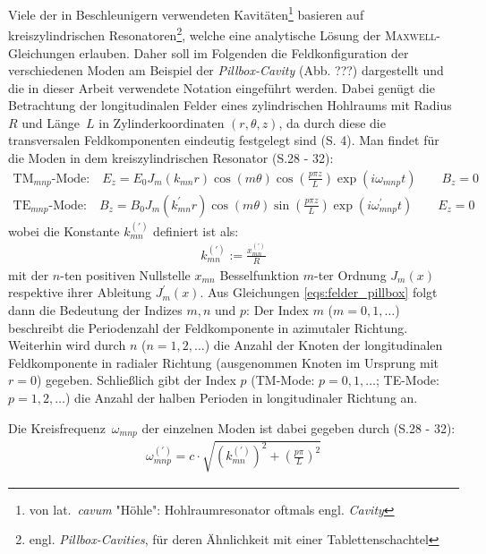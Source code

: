 Viele der in Beschleunigern verwendeten Kavitäten\footnote{von lat.\ \emph{cavum} "Höhle": Hohlraumresonator oftmals engl. \emph{Cavity}} basieren auf kreiszylindrischen Resonatoren\footnote{engl. \emph{Pillbox-Cavities}, für deren Ähnlichkeit mit einer Tablettenschachtel}, welche eine analytische Lösung der \textsc{Maxwell}-Gleichungen erlauben.
Daher soll im Folgenden die Feldkonfiguration der verschiedenen Moden am Beispiel der \emph{Pillbox-Cavity} (Abb. ???) dargestellt und die in dieser Arbeit verwendete Notation eingeführt werden.
Dabei genügt die Betrachtung der longitudinalen Felder eines zylindrischen Hohlraums mit Radius~$R$ und Länge~$L$ in Zylinderkoordinaten $(r, \theta, z)$, da durch diese die transversalen Feldkomponenten eindeutig festgelegt sind \cite{hillert} (S. 4).
Man findet für die Moden in dem kreiszylindrischen Resonator \cite{wangler} (S.28 - 32):
\begin{subequations}
  \begin{align}
  \mathrm{TM}_{mnp}\text{-Mode:} \quad E_z = E_0 J_m(k_{mn} r) \cos(m \theta) \cos\left(\frac{p \pi z}{L}\right) \exp(i \omega_{mnp} t) \qquad B_z = 0\\
  \mathrm{TE}_{mnp}\text{-Mode:} \quad B_z = B_0 J_m(k_{mn}^\prime r) \cos(m \theta) \sin\left(\frac{p \pi z}{L}\right) \exp(i \omega_{mnp}^\prime t) \qquad  E_z = 0
  \end{align}
  \label{eqs:felder_pillbox}
\end{subequations}
wobei die Konstante $k_{mn}^{(\prime)}$ definiert ist als:
\begin{align}
k_{mn}^{(\prime)} := \frac{x_{mn}^{(\prime)}}{R}
\end{align}
mit der $n$-ten positiven Nullstelle $x_{mn}$ Besselfunktion $m$-ter Ordnung $J_m(x)$ respektive ihrer Ableitung $J_m^\prime(x)$.
Aus Gleichungen \eqref{eqs:felder_pillbox} folgt dann die Bedeutung der Indizes $m, n$ und $p$:
Der Index $m$ ($m=0, 1, \dots$) beschreibt die Periodenzahl der Feldkomponente in azimutaler Richtung.
Weiterhin wird durch $n$ ($n=1, 2, \dots$) die Anzahl der Knoten der longitudinalen Feldkomponente in radialer Richtung (ausgenommen Knoten im Ursprung mit $r=0$) gegeben.
Schließlich gibt der Index $p$ (TM-Mode: $p= 0, 1, \dots$; TE-Mode: $p = 1, 2, \dots$) die Anzahl der halben Perioden in longitudinaler Richtung an.

Die Kreisfrequenz~$\omega_{mnp}$ der einzelnen Moden ist dabei gegeben durch \cite{wangler} (S.28 - 32):
\begin{align}
\omega_{mnp}^{(\prime)} = c \cdot \sqrt{\left( k_{mn}^{(\prime)}\right)^2 + \left( \frac{p \pi}{L} \right)^2}
\end{align}

